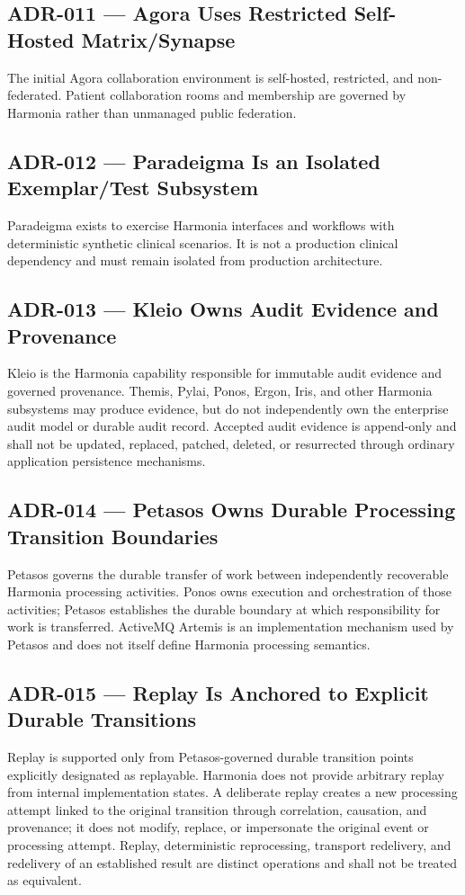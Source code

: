\subsection{ADR-011 --- Agora Uses Restricted Self-Hosted Matrix/Synapse}
The initial Agora collaboration environment is self-hosted, restricted, and non-federated. Patient collaboration rooms and membership are governed by Harmonia rather than unmanaged public federation.

\subsection{ADR-012 --- Paradeigma Is an Isolated Exemplar/Test Subsystem}
Paradeigma exists to exercise Harmonia interfaces and workflows with deterministic synthetic clinical scenarios. It is not a production clinical dependency and must remain isolated from production architecture.

\subsection{ADR-013 --- Kleio Owns Audit Evidence and Provenance}
Kleio is the Harmonia capability responsible for immutable audit evidence and governed provenance. Themis, Pylai, Ponos, Ergon, Iris, and other Harmonia subsystems may produce evidence, but do not independently own the enterprise audit model or durable audit record. Accepted audit evidence is append-only and shall not be updated, replaced, patched, deleted, or resurrected through ordinary application persistence mechanisms.

\subsection{ADR-014 --- Petasos Owns Durable Processing Transition Boundaries}
Petasos governs the durable transfer of work between independently recoverable Harmonia processing activities. Ponos owns execution and orchestration of those activities; Petasos establishes the durable boundary at which responsibility for work is transferred. ActiveMQ Artemis is an implementation mechanism used by Petasos and does not itself define Harmonia processing semantics.

\subsection{ADR-015 --- Replay Is Anchored to Explicit Durable Transitions}
Replay is supported only from Petasos-governed durable transition points explicitly designated as replayable. Harmonia does not provide arbitrary replay from internal implementation states. A deliberate replay creates a new processing attempt linked to the original transition through correlation, causation, and provenance; it does not modify, replace, or impersonate the original event or processing attempt. Replay, deterministic reprocessing, transport redelivery, and redelivery of an established result are distinct operations and shall not be treated as equivalent.

